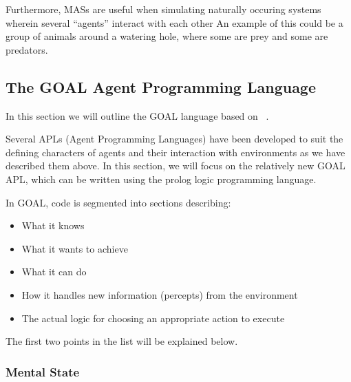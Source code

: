 Furthermore, MASs are useful when simulating naturally occuring systems
wherein several ``agents'' interact with each other An example of
this could be a group of animals around a watering hole, where some
are prey and some are predators.


\subsection{The GOAL Agent Programming Language}

In this section we will outline the GOAL language based on ~\cite{Hindriks09}.

Several APLs (Agent Programming Languages) have been developed to
suit the defining characters of agents and their interaction with
environments as we have described them above. In this section, we
will focus on the relatively new GOAL APL, which can be written using
the prolog logic programming language.

In GOAL, code is segmented into sections describing:
\begin{itemize}
\item What it knows
\item What it wants to achieve
\item What it can do
\item How it handles new information (percepts) from the environment
\item The actual logic for choosing an appropriate action to execute
\end{itemize}
The first two points in the list will be explained below. 


\subsubsection*{Mental State}

